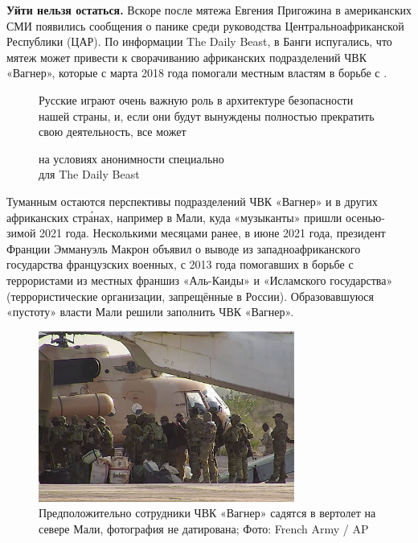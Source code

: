 \textbf{Уйти нельзя остаться.} Вскоре после мятежа Евгения Пригожина в американских СМИ появились сообщения о панике среди руководства Центральноафриканской Республики (ЦАР). По информации The Daily Beast, в Банги испугались, что мятеж может привести к сворачиванию африканских подразделений ЧВК «Вагнер», которые с марта 2018 года помогали местным властям в борьбе с .


\begin{figure}
    \begin{fancyquotes}
        Русские играют очень важную роль в архитектуре безопасности нашей страны, и, если они будут вынуждены полностью прекратить свою деятельность, все может \\

        \begin{flushright}
            на условиях анонимности специально\\

            для The Daily Beast
        \end{flushright}
    \end{fancyquotes}
\end{figure}
Туманным остаются перспективы подразделений ЧВК «Вагнер» и в других африканских стр\'{а}нах, например в Мали, куда «музыканты» пришли осенью-зимой 2021 года. Несколькими месяцами ранее, в июне 2021 года, президент Франции Эммануэль Макрон объявил о выводе из западноафриканского государства французских военных, с 2013 года помогавших в борьбе с террористами из местных франшиз «Аль-Каиды» и «Исламского государства» (террористические организации, запрещённые в России). Образовавшуюся «пустоту» власти Мали решили заполнить ЧВК «Вагнер».

\begin{figure}[h]
    \centering
    \includegraphics[width=0.75\textwidth]{img/pmc_africa_1.jpg}
    \caption{Предположительно сотрудники ЧВК «Вагнер» садятся в вертолет на севере Мали, фотография не датирована; Фото: French Army / AP}
\end{figure}

